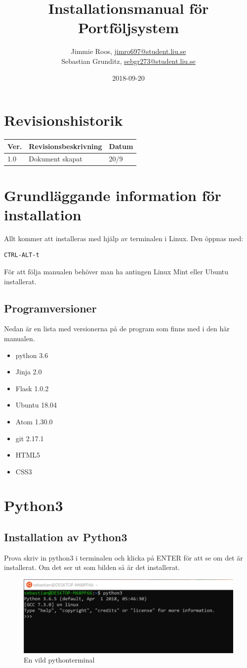 \documentclass{TDP003mall}
\author{Jimmie Roos, \url{jimro697@student.liu.se}\\
        Sebastian Grunditz, \url{sebgr273@student.liu.se}}
\title{Installationsmanual för Portföljsystem}
\date{2018-09-20}
\begin{document}
\projectpage
\tableofcontents
\clearpage
\section{Revisionshistorik}
\begin{table}[!h]
\begin{tabularx}{\linewidth}{|l|X|l|}
\hline
Ver. & Revisionsbeskrivning & Datum \\\hline
1.0 & Dokument skapat & 20/9\\\hline
\end{tabularx}
\end{table}

\section{Grundläggande information för installation}
Allt kommer att installeras med hjälp av terminalen i Linux. Den öppnas med:
\begin{lstlisting}[language=bash]
  CTRL-ALT-t
\end{lstlisting}
För att följa manualen behöver man ha antingen Linux Mint eller Ubuntu installerat.
\subsection{Programversioner}
Nedan är en lista med versionerna på de program som finns med i den här manualen.
\begin{itemize}
  \item python 3.6
  \item Jinja 2.0
  \item Flask 1.0.2
  \item Ubuntu 18.04
  \item Atom 1.30.0
  \item git 2.17.1
  \item HTML5
  \item CSS3
\end{itemize}


\section{Python3}
\subsection{Installation av Python3}
Prova skriv in python3 i terminalen och klicka på ENTER för
att se om det är installerat. Om det ser ut som bilden så är det installerat.
\begin{figure}[H]
  \includegraphics[width=0.6\linewidth]{python.png}
  \caption{En vild pythonterminal}
  \label{fig:python}
\end{figure}
\end{document}
